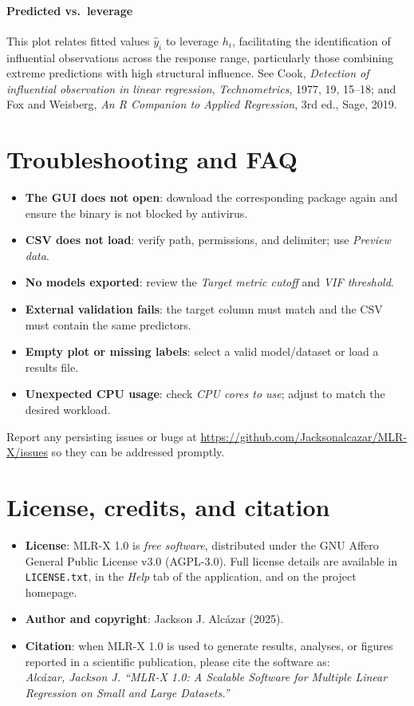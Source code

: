 \documentclass[11pt,a4paper]{article}
\begin{document}
\paragraph{Predicted vs.\ leverage}
This plot relates fitted values $\hat{y}_i$ to leverage $h_i$, facilitating the identification of influential observations across the response range, particularly those combining extreme predictions with high structural influence.
See Cook, \emph{Detection of influential observation in linear regression}, \emph{Technometrics}, 1977, 19, 15--18; and Fox and Weisberg, \emph{An R Companion to Applied Regression}, 3rd ed., Sage, 2019.


\section{Troubleshooting and FAQ}
\begin{itemize}
  \item \textbf{The GUI does not open}: download the corresponding package again and ensure the binary is not blocked by antivirus.
  \item \textbf{CSV does not load}: verify path, permissions, and delimiter; use \emph{Preview data}.
  \item \textbf{No models exported}: review the \emph{Target metric cutoff} and \emph{VIF threshold}.
  \item \textbf{External validation fails}: the target column must match and the CSV must contain the same predictors.
  \item \textbf{Empty plot or missing labels}: select a valid model/dataset or load a results file.
  \item \textbf{Unexpected CPU usage}: check \emph{CPU cores to use}; adjust to match the desired workload.
\end{itemize}
Report any persisting issues or bugs at \url{https://github.com/Jacksonalcazar/MLR-X/issues} so they can be addressed promptly.

\section{License, credits, and citation}
\begin{itemize}
  \item \textbf{License}: MLR-X 1.0 is \emph{free software}, distributed under the GNU Affero General Public License v3.0 (AGPL-3.0). Full license details are available in \texttt{LICENSE.txt}, in the \emph{Help} tab of the application, and on the project homepage.

  \item \textbf{Author and copyright}: Jackson J. Alcázar (2025).

  \item \textbf{Citation}: when MLR-X 1.0 is used to generate results, analyses, or figures reported in a scientific publication, please cite the software as:\\
  \emph{Alcázar, Jackson J. ``MLR-X 1.0: A Scalable Software for Multiple Linear Regression on Small and Large Datasets.''}
\end{itemize}
\end{document}
